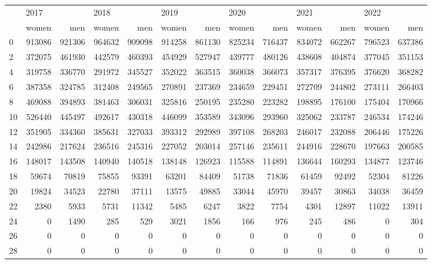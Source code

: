 \begin{tabular}{lrrrrrrrrrrrr}
\toprule
{} & \multicolumn{2}{l}{2017} & \multicolumn{2}{l}{2018} & \multicolumn{2}{l}{2019} & \multicolumn{2}{l}{2020} & \multicolumn{2}{l}{2021} & \multicolumn{2}{l}{2022} \\
{} &   women &     men &   women &     men &   women &     men &   women &     men &   women &     men &   women &     men \\
\midrule
0  &  913086 &  921306 &  964632 &  909098 &  914258 &  861130 &  825234 &  716437 &  834072 &  662267 &  796523 &  637386 \\
2  &  372075 &  461930 &  442579 &  460393 &  454929 &  527947 &  439777 &  480126 &  438608 &  404874 &  377045 &  351153 \\
4  &  319758 &  336770 &  291972 &  345527 &  352022 &  363515 &  360038 &  366073 &  357317 &  376395 &  376620 &  368282 \\
6  &  387358 &  324785 &  312408 &  249565 &  270891 &  237369 &  234659 &  229451 &  272709 &  244802 &  273111 &  266403 \\
8  &  469088 &  394893 &  381463 &  306031 &  325816 &  250195 &  235280 &  223282 &  198895 &  176100 &  175404 &  170966 \\
10 &  526440 &  445497 &  492617 &  430318 &  446099 &  353589 &  343096 &  293960 &  325062 &  233787 &  246534 &  174246 \\
12 &  351905 &  334360 &  385631 &  327033 &  393312 &  292989 &  397108 &  268203 &  246017 &  232088 &  206446 &  175226 \\
14 &  242986 &  217624 &  236516 &  245316 &  227052 &  203014 &  257146 &  235611 &  244916 &  228670 &  197663 &  200585 \\
16 &  148017 &  143508 &  140940 &  140518 &  138148 &  126923 &  115588 &  114891 &  136644 &  160293 &  134877 &  123746 \\
18 &   59674 &   70819 &   75855 &   93391 &   63201 &   84409 &   51738 &   71836 &   61459 &   92492 &   52304 &   81226 \\
20 &   19824 &   34523 &   22780 &   37111 &   13575 &   49885 &   33044 &   45970 &   39457 &   30863 &   34038 &   36459 \\
22 &    2380 &    5933 &    5731 &   11342 &    5485 &    6247 &    3822 &    7754 &    4301 &   12897 &   11022 &   13911 \\
24 &       0 &    1490 &     285 &     529 &    3021 &    1856 &     166 &     976 &     245 &     486 &       0 &     304 \\
26 &       0 &       0 &       0 &       0 &       0 &       0 &       0 &       0 &       0 &       0 &       0 &       0 \\
28 &       0 &       0 &       0 &       0 &       0 &       0 &       0 &       0 &       0 &       0 &       0 &       0 \\
\bottomrule
\end{tabular}
